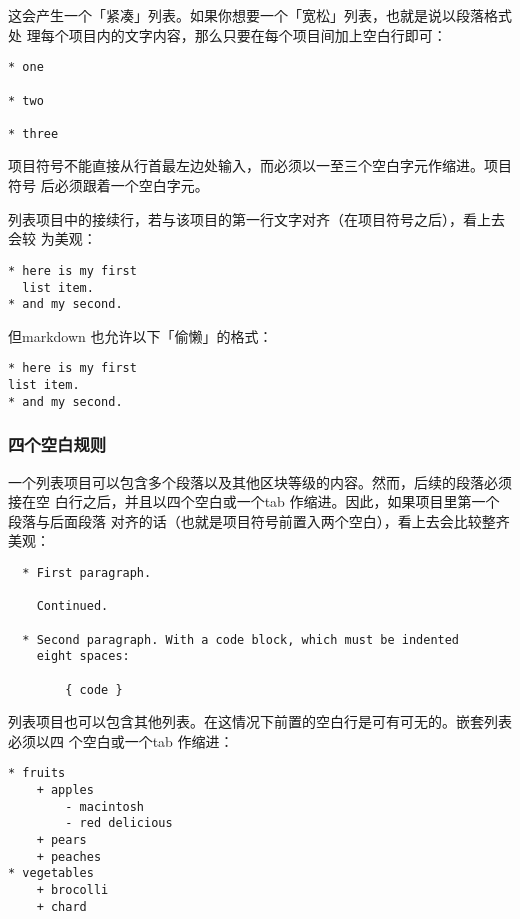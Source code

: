 \documentclass[fancyhdr,bookmark]{ctexbook}
\begin{document}
这会产生一个「紧凑」列表。如果你想要一个「宽松」列表，也就是说以段落格式处
理每个项目内的文字内容，那么只要在每个项目间加上空白行即可：

\begin{lstlisting}
* one

* two

* three
\end{lstlisting}

项目符号不能直接从行首最左边处输入，而必须以一至三个空白字元作缩进。项目符号
后必须跟着一个空白字元。

列表项目中的接续行，若与该项目的第一行文字对齐（在项目符号之后），看上去会较
为美观：

\begin{lstlisting}
* here is my first
  list item.
* and my second.
\end{lstlisting}

但markdown 也允许以下「偷懒」的格式：

\begin{lstlisting}
* here is my first
list item.
* and my second.
\end{lstlisting}

\hypertarget{ux56dbux4e2aux7a7aux767dux89c4ux5219}{%
\subsubsection{四个空白规则}\label{ux56dbux4e2aux7a7aux767dux89c4ux5219}}

一个列表项目可以包含多个段落以及其他区块等级的内容。然而，后续的段落必须接在空
白行之后，并且以四个空白或一个tab
作缩进。因此，如果项目里第一个段落与后面段落
对齐的话（也就是项目符号前置入两个空白），看上去会比较整齐美观：

\begin{lstlisting}
  * First paragraph.

    Continued.

  * Second paragraph. With a code block, which must be indented
    eight spaces:

        { code }
\end{lstlisting}

列表项目也可以包含其他列表。在这情况下前置的空白行是可有可无的。嵌套列表必须以四
个空白或一个tab 作缩进：

\begin{lstlisting}
* fruits
    + apples
        - macintosh
        - red delicious
    + pears
    + peaches
* vegetables
    + brocolli
    + chard
\end{lstlisting}
\end{document}
